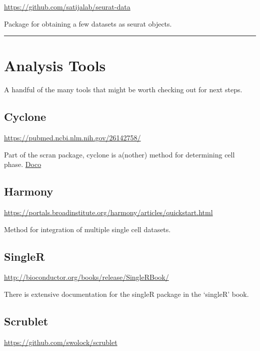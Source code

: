 \documentclass[
]{book}
\begin{document}
\url{https://github.com/satijalab/seurat-data}

Package for obtaining a few datasets as seurat objects.

\begin{center}\rule{0.5\linewidth}{0.5pt}\end{center}

\section{Analysis Tools}\label{analysis-tools}

A handful of the many tools that might be worth checking out for next steps.

\subsection*{Cyclone}\label{cyclone}

\url{https://pubmed.ncbi.nlm.nih.gov/26142758/}

Part of the scran package, cyclone is a(nother) method for determining cell phase.
\href{https://rdrr.io/bioc/scran/man/cyclone.html}{Doco}

\subsection*{Harmony}\label{harmony}

\url{https://portals.broadinstitute.org/harmony/articles/quickstart.html}

Method for integration of multiple single cell datasets.

\subsection*{SingleR}\label{singler-1}

\url{http://bioconductor.org/books/release/SingleRBook/}

There is extensive documentation for the singleR package in the `singleR' book.

\subsection*{Scrublet}\label{scrublet}

\url{https://github.com/swolock/scrublet}
\end{document}
